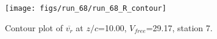 \begin{figure}[H]
\centering
\texttt{[image: figs/run\_68/run\_68\_R\_contour]}
\caption{Contour plot of $\overline{v_{r}}$ at $z/c$=10.00, $V_{free}$=29.17, station 7.}
\label{fig:run_68_R_contour}
\end{figure}


